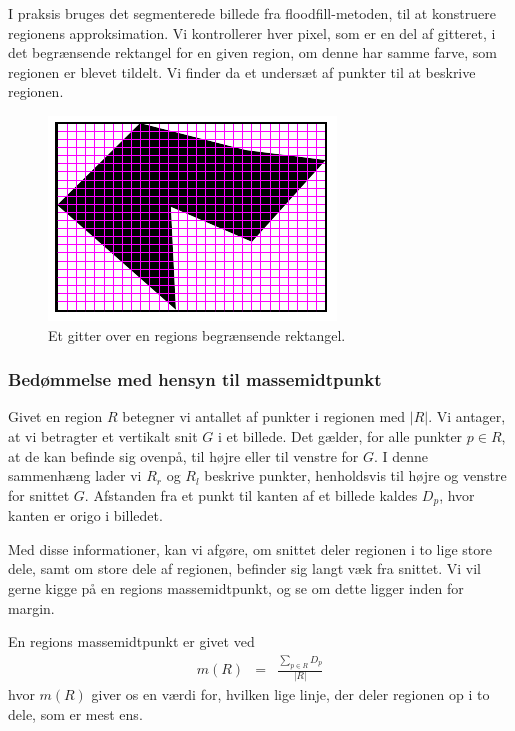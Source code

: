 {I praksis bruges det segmenterede billede fra floodfill-metoden, til at
konstruere regionens approksimation. Vi kontrollerer hver pixel, som er
en del af gitteret, i det begrænsende rektangel for en given region, om
denne har samme farve, som regionen er blevet tildelt. Vi finder da et
undersæt af punkter til at beskrive regionen.

\begin{figure}[h]
    \centering
    \includegraphics[scale=0.76,angle=0]{afsnit/vores_implementation/billeder/udvidet_loesning/udvidetloesninglayer.png}
    \caption[]{Et gitter over en regions begrænsende rektangel.}
    \label{grid}
\end{figure}

\subsubsection{Bedømmelse med hensyn til massemidtpunkt}
Givet en region $R$ betegner vi antallet af punkter i regionen med
$|R|$. Vi antager, at vi betragter et vertikalt snit $G$ i et billede.
Det gælder, for alle punkter $p \in R$, at de kan befinde sig ovenpå,
til højre eller til venstre for $G$. I denne sammenhæng lader vi $R_r$
og $R_l$ beskrive punkter, henholdsvis til højre og venstre for snittet
$G$.  Afstanden fra et punkt til kanten af et billede kaldes $D_p$, hvor
kanten er origo i billedet.

Med disse informationer, kan vi afgøre, om snittet deler regionen i to
lige store dele, samt om store dele af regionen, befinder sig langt væk
fra snittet. Vi vil gerne kigge på en regions massemidtpunkt, og se om
dette ligger inden for margin.

\begin{definition}
    En regions massemidtpunkt er givet ved
    \begin{eqnarray}
        m(R) & = & \frac{\sum_{p \in R}{D_p}}{|R|} \label{masssemidpunkt}
        \label{MPunkt}
    \end{eqnarray}
    hvor $m(R)$ giver os en værdi for, hvilken lige linje, der deler
    regionen op i to dele, som er mest ens.
    \label{def_massemidtpunkt}
\end{definition}

}
